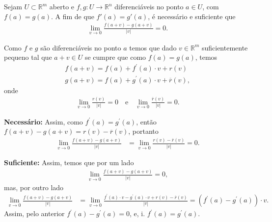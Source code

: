 \begin{homeworkProblem}[Seção 1-2]
  Sejam $U \subset \mathbb{R}^m$ aberto e $f,g : U \to \mathbb{R}^n$ diferenciáveis no ponto $a \in U$, com $f(a)=g(a)$. A fim de que $f'(a)=g'(a)$, é necessário e suficiente que
  \begin{align*}
    \lim_{v\to 0} \frac{f(a+v)-g(a+v)}{|v|} = 0.   
  \end{align*}
  \begin{solution}
    Como $f$ e $g$ são diferenciáveis no ponto $a$ temos que dado $v\in \mathbb{R}^{m}$ suficientemente pequeno tal que $a+v\in U$ se cumpre que como $f(a)=g(a)$, temos
    \begin{align*}
      f(a+v)=f(a)+f^{\prime}(a)\cdot v+r(v)\\
      g(a+v)=f(a)+g^{\prime}(a)\cdot v+\overline{r}(v),
    \end{align*}
    onde
    \begin{align*}
      \lim_{v \to 0}\frac{r(v)}{|v|}=0\quad\text{e}\quad \lim_{v \to 0}\frac{\overline{r}(v)}{|v|}=0.
    \end{align*}

    \textbf{Necessário:} 
    Assim, como $f^{\prime}(a)=g^{\prime}(a)$, então $f(a+v)-g(a+v)=r(v)-\overline{r}(v)$, portanto
    \begin{align*}
      \lim_{v \to 0}\frac{f(a+v)-g(a+v)}{|v|}&=\lim_{v\to 0}\frac{r(v)-\overline{r}(v)}{|v|}=0.
    \end{align*}

    \textbf{Suficiente:}
    Assim, temos que por um lado
    \begin{align*}
      \lim_{v \to 0}\frac{f(a+v)-g(a+v)}{|v|}=0,
    \end{align*}
    mas, por outro lado
    \begin{align*}
      \lim_{v \to 0}\frac{f(a+v)-g(a+v)}{|v|}&=\lim_{v \to 0}\frac{f^{\prime}(a)\cdot v-g^{\prime}(a)\cdot v+r(v)-\overline{r}(v)}{|v|}=(f^{\prime}(a)-g^{\prime}(a))\cdot v.
    \end{align*}
    Assim, pelo anterior $f^{\prime}(a)-g^{\prime}(a)=0$, e, i. $f^{\prime}(a)=g^{\prime}(a)$.
  \end{solution}
\end{homeworkProblem}
